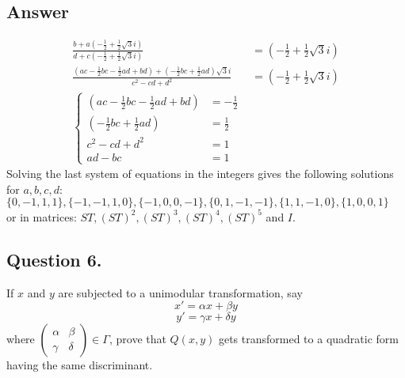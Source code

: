 \subsection*{Answer}
\noindent
\begin{align*}
    \frac{b + a (-\frac{1}{2}+\frac{1}{2}\sqrt{3}i)}{d + c (-\frac{1}{2}+\frac{1}{2}\sqrt{3}i)} &= (-\frac{1}{2}+\frac{1}{2}\sqrt{3}i) \\
    \frac{(a c - \frac{1}{2}b c - \frac{1}{2}a d + b d)+(- \frac{1}{2} bc + \frac{1}{2} ad)\sqrt{3}i}{c^2 - cd + d^2}&= (-\frac{1}{2}+\frac{1}{2}\sqrt{3}i) \\
    \left\{
    \begin{array}{ll}
        (a c - \frac{1}{2}b c - \frac{1}{2}a d + b d) &= -\frac{1}{2} \\
        (- \frac{1}{2} bc + \frac{1}{2} ad) &= \frac{1}{2}  \\
        c^2 - cd + d^2 &= 1 \\
        ad - bc &= 1
    \end{array}
    \right.
\end{align*}
Solving the last system of equations in the integers gives the following solutions for ${a,b,c,d}$: \\
$\{0,-1,1,1\},\{-1,-1,1,0\},\{-1,0,0,-1\},\{0,1,-1,-1\},\{1,1,-1,0\},\{1,0,0,1\}$ \\or in matrices:
$ST, (ST)^2, (ST)^3, (ST)^4, (ST)^5$ and $I$.


\subsection{Question 6.}
\noindent
If $x$ and $y$ are subjected to a unimodular transformation, say
\[
    x' = \alpha x + \beta y
\]
\[
    y' = \gamma x + \delta y
\]
where $\begin{pmatrix} \alpha & \beta \\ \gamma & \delta \end{pmatrix} \in \Gamma$, prove that $Q(x,y)$ gets
transformed to a quadratic form having the same discriminant.

